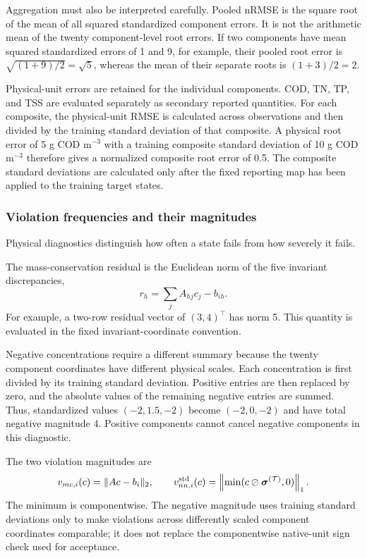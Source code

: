 Aggregation must also be interpreted carefully. Pooled nRMSE is the square root of the mean of all squared standardized component errors. It is not the arithmetic mean of the twenty component-level root errors. If two components have mean squared standardized errors of 1 and 9, for example, their pooled root error is
$\sqrt{(1+9)/2}=\sqrt5$,
whereas the mean of their separate roots is
$(1+3)/2=2$.

Physical-unit errors are retained for the individual components. COD, TN, TP, and TSS are evaluated separately as secondary reported quantities. For each composite, the physical-unit RMSE is calculated across observations and then divided by the training standard deviation of that composite. A physical root error of 5 g COD m$^{-3}$ with a training composite standard deviation of 10 g COD m$^{-3}$ therefore gives a normalized composite root error of 0.5. The composite standard deviations are calculated only after the fixed reporting map has been applied to the training target states.

\subsubsection{Violation frequencies and their magnitudes}

Physical diagnostics distinguish how often a state fails from how severely it fails.

The mass-conservation residual is the Euclidean norm of the five invariant discrepancies,
\[
r_h=\sum_jA_{hj}c_j-b_{ih}.
\]
For example, a two-row residual vector of $(3,4)^\top$ has norm 5. This quantity is evaluated in the fixed invariant-coordinate convention.

Negative concentrations require a different summary because the twenty component coordinates have different physical scales. Each concentration is first divided by its training standard deviation. Positive entries are then replaced by zero, and the absolute values of the remaining negative entries are summed. Thus, standardized values $(-2,1.5,-2)$ become $(-2,0,-2)$ and have total negative magnitude 4. Positive components cannot cancel negative components in this diagnostic.

The two violation magnitudes are
\begin{equation}
\equationname{Mass conservation residual and standardized negative concentration}
v_{mc,i}(c)=\|Ac-b_i\|_2,\qquad
v_{nn,i}^{\mathrm{std}}(c)=
\left\|\min(c\oslash\boldsymbol{\sigma}^{(\mathcal{T})},0)\right\|_1.
\label{eq:projection_violation_magnitudes}
\end{equation}
The minimum is componentwise. The negative magnitude uses training standard deviations only to make violations across differently scaled component coordinates comparable; it does not replace the componentwise native-unit sign check used for acceptance.

